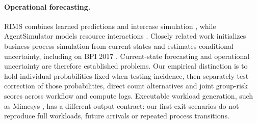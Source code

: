 \paragraph{Operational forecasting.}
RIMS combines learned predictions and intercase simulation
\citep{meneghello2025}, while AgentSimulator models resource interactions
\citep{kirchdorfer2025}. Closely related work initializes business-process
simulation from current states and estimates conditional uncertainty,
including on BPI 2017 \citep{avramenko2026}. Current-state forecasting and
operational uncertainty are therefore established problems. Our empirical
distinction is to hold individual probabilities fixed when testing incidence,
then separately test correction of those probabilities, direct count
alternatives and joint group-risk scores across workflow and compute logs.
Executable workload generation, such as Mimesys \citep{kim2026}, has a
different output contract: our first-exit scenarios do not reproduce full
workloads, future arrivals or repeated process transitions.
